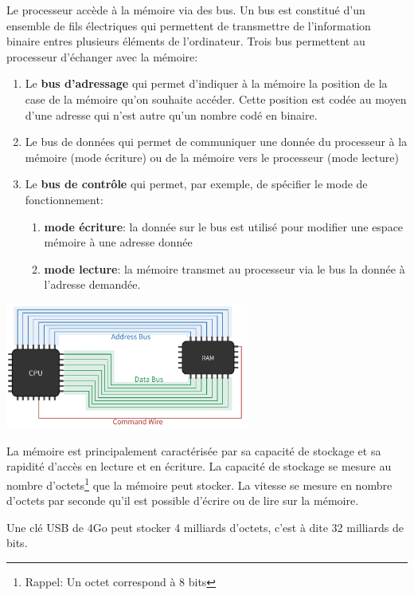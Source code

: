 \begin{eclairage}
 Le processeur accède à la mémoire via des bus. Un bus est constitué d'un ensemble de fils électriques qui permettent de transmettre de l'information binaire entres plusieurs éléments de l'ordinateur. Trois bus permettent au processeur d'échanger avec la mémoire:
 \begin{enumerate}
 	\item Le \textbf{bus d'adressage} qui permet d'indiquer à la mémoire la position de la case de la mémoire qu'on souhaite accéder. Cette position est codée au moyen d'une adresse qui n'est autre qu'un nombre codé en binaire.
 	\item Le bus de données qui permet de communiquer une donnée du processeur à la mémoire (mode écriture) ou de la mémoire vers le processeur (mode lecture)
 	\item Le \textbf{bus de contrôle} qui permet, par exemple, de spécifier le mode de fonctionnement:
 		\begin{enumerate}
 			\item \textbf{mode écriture}: la donnée sur le bus est utilisé pour modifier une espace mémoire à une adresse donnée
 			\item \textbf{mode lecture}: la mémoire transmet au processeur via le bus la donnée à l'adresse demandée.
 		\end{enumerate}
 \end{enumerate}
\begin{center}
	\includegraphics[trim=0 0 0 0,width=0.6\textwidth]{Images/ordinateur/cablage_memoire.png}
\end{center}
\end{eclairage}


\begin{important}
	La mémoire est principalement caractérisée par sa capacité de stockage et sa rapidité d'accès en lecture et en écriture. La capacité de stockage se mesure au nombre d'octets\footnote{Rappel: Un octet correspond à 8 bits} que la mémoire peut stocker. La vitesse se mesure en nombre d'octets par seconde qu'il est possible d'écrire ou de lire sur la mémoire.
\end{important}
\begin{myexample}
	Une clé USB de 4Go peut stocker 4 milliards d'octets, c'est à dite 32 milliards de bits.
\end{myexample}
 
